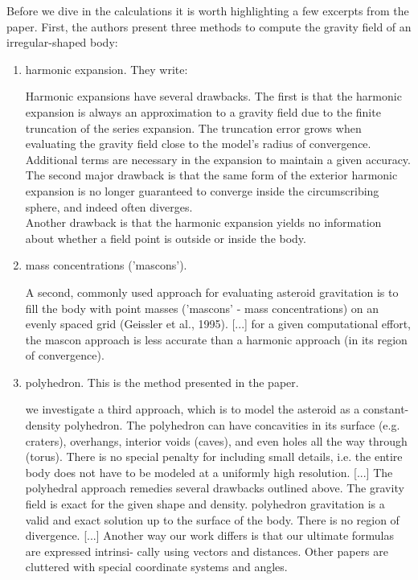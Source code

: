 Before we dive in the calculations it is worth highlighting a few excerpts from the paper. 
First, the authors present three methods to compute the gravity field of an irregular-shaped
body:
\begin{enumerate}
\item harmonic expansion. They write:
\begin{displayquote}
{\color{darkgray}
Harmonic expansions have several drawbacks. 
The first is that the harmonic expansion is always an approximation to a gravity field due to the finite
truncation of the series expansion. The truncation error grows when evaluating
the gravity field close to the model's radius of convergence. Additional terms are
necessary in the expansion to maintain a given accuracy.\\
The second major drawback is that the same form of the exterior harmonic
expansion is no longer guaranteed to converge inside the circumscribing sphere,
and indeed often diverges.\\
Another drawback is that the harmonic expansion yields no information about
whether a field point is outside or inside the body.}
\end{displayquote}

\item mass concentrations ('mascons').

\begin{displayquote}
{\color{darkgray}
A second, commonly used approach for evaluating asteroid gravitation is to fill the
body with point masses ('mascons' - mass concentrations) on an evenly spaced
grid (Geissler et al., 1995).
[...] for a given computational effort, the mascon approach is less accurate than 
a harmonic approach (in its region of convergence).}
\end{displayquote}


\item polyhedron. This is the method presented in the paper. 
\begin{displayquote}
{\color{darkgray}
we investigate a third approach, which is to model the asteroid as a
constant-density polyhedron. The polyhedron can have concavities in its surface
(e.g. craters), overhangs, interior voids (caves), and even holes all the way through
(torus). There is no special penalty for including small details, i.e. the entire body
does not have to be modeled at a uniformly high resolution.
[...] The polyhedral approach remedies several drawbacks outlined above.
The gravity field is exact for the given shape and density.
polyhedron gravitation is a valid and exact solution up to the surface of
the body. There is no region of divergence.
[...] Another way our work differs is that our ultimate formulas are expressed intrinsi-
cally using vectors and distances. Other papers are cluttered with special coordinate
systems and angles.
}
\end{displayquote}

\end{enumerate}


